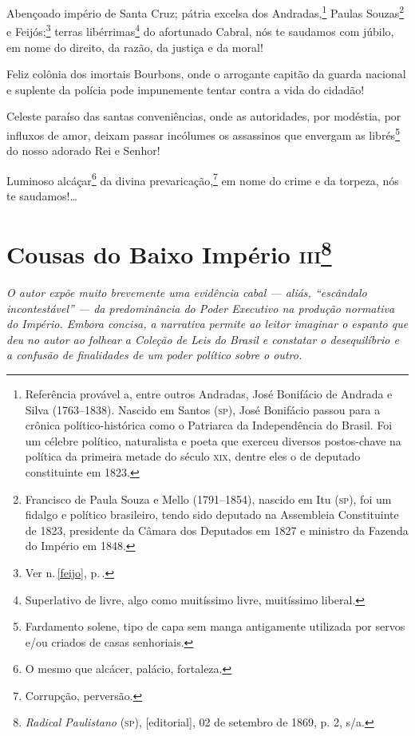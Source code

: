 Abençoado império de Santa Cruz; pátria excelsa dos Andradas,\footnote{
  Referência provável a, entre outros Andradas, José Bonifácio de
  Andrada e Silva (1763--1838). Nascido em Santos (\textsc{sp}), José Bonifácio
  passou para a crônica político-histórica como o Patriarca da
  Independência do Brasil. Foi um célebre político, naturalista e poeta
  que exerceu diversos postos-chave na política da primeira metade do
  século \textsc{xix}, dentre eles o de deputado constituinte em 1823.} Paulas
Souzas\footnote{Francisco de Paula Souza e Mello (1791--1854), nascido
  em Itu (\textsc{sp}), foi um fidalgo e político brasileiro, tendo sido deputado
  na Assembleia Constituinte de 1823, presidente da Câmara dos Deputados
  em 1827 e ministro da Fazenda do Império em 1848.} e
Feijós;\footnote{Ver n.\,\ref{feijo}, p.\,\pageref{feijo}.} terras libérrimas\footnote{Superlativo de livre,
  algo como muitíssimo livre, muitíssimo liberal.} do afortunado Cabral,
nós te saudamos com júbilo, em nome do direito, da razão, da justiça e
da moral!

Feliz colônia dos imortais Bourbons, onde o arrogante capitão da guarda
nacional e suplente da polícia pode impunemente tentar contra a vida do
cidadão!

Celeste paraíso das santas conveniências, onde as autoridades, por
modéstia, por influxos de amor, deixam passar incólumes os assassinos
que envergam as librés\footnote{Fardamento solene, tipo de capa sem
  manga antigamente utilizada por servos e/ou criados de casas
  senhoriais.} do nosso adorado Rei e Senhor!

Luminoso alcáçar\footnote{O mesmo que alcácer, palácio, fortaleza.} da
divina prevaricação,\footnote{Corrupção, perversão.} em nome do crime
e da torpeza, nós te saudamos!\ldots{}

\chapter{Cousas do Baixo Império \textsc{iii}\footnote{\emph{Radical
  Paulistano} (\textsc{sp}), {[}editorial{]}, 02 de setembro de 1869, p. 2, s/a.}}

\begin{didascalia}\itshape
O autor expõe muito brevemente uma evidência cabal --- aliás, ``escândalo
incontestável'' --- da predominância do Poder Executivo na produção
normativa do Império. Embora concisa, a narrativa permite ao leitor
imaginar o espanto que deu no autor ao folhear a \textnormal{Coleção de Leis do
Brasil} e constatar o desequilíbrio e a confusão de finalidades de um
poder político sobre o outro.
\end{didascalia}



